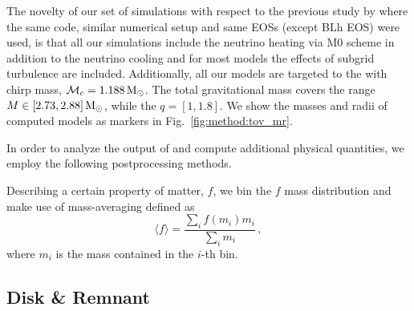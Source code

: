 %

The novelty of our set of simulations with 
respect to the previous study by \citet{Radice:2018pdn} where the same code,
similar numerical setup and same \acp{EOS} (except BLh \ac{EOS}) were used, 
is that all our simulations include the neutrino heating via 
M0 scheme in addition to the neutrino cooling 
and for most models the effects of subgrid turbulence  
are included.  %
Additionally, all our models are targeted to the \GW{} 
with chirp mass, $\mathcal{M}_c = 1.188\,{\text{M}_{\odot}}$.   
The total gravitational mass covers 
the range $M\in[2.73, 2.88]\,{\text{M}_{\odot}}$, while the \mr{} $q=[1,1.8]$. 
%
We show the masses and radii of computed models as markers in 
Fig.~\ref{fig:method:tov_mr}.

In order to analyze the output of \wisky{} and compute 
additional physical quantities, we employ the following 
postprocessing methods. 



Describing a certain property of matter, $f$, we bin the 
$f$ mass distribution and make use of mass-averaging defined as 
%
\begin{equation}
\label{eq:ppr:average}
\langle f \rangle = \frac{\sum_i f(m_i)m_i}{\sum_i m_i}\, ,
\end{equation}
%
where $m_i$ is the mass contained in the $i$-th bin.



\subsection{Disk \& Remnant}\label{sec:bns_sims:method:disk}

